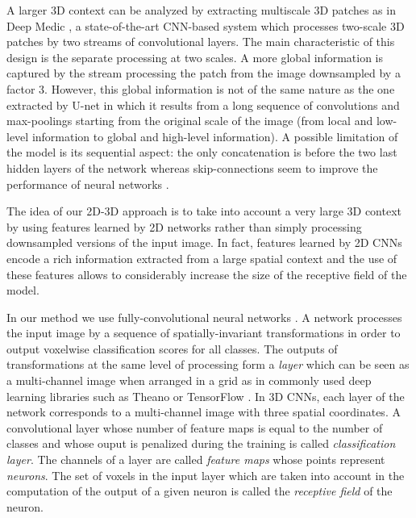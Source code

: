 \documentclass[preprint,12pt]{elsarticle}
\begin{document}
A larger 3D context can be analyzed by extracting multiscale 3D patches as in Deep Medic \cite{kamnitsas2016efficient}, a state-of-the-art CNN-based system which processes two-scale 3D patches by two streams of convolutional layers. The main characteristic of this design is the separate processing at two scales. A more global information is captured by the stream processing the patch from the image downsampled by a factor 3. However, this global information is not of the same nature as the one extracted by U-net \cite{ronneberger2015u} in which it results from a long sequence of convolutions and max-poolings starting from the original scale of the image (from local and low-level information to global and high-level information). A possible limitation of the model is its sequential aspect: the only concatenation is before the two last hidden layers of the network whereas skip-connections seem to improve the performance of neural networks \cite{he2016deep}.





The idea of our 2D-3D approach is to take into account a very large 3D context by using features learned by 2D networks rather than simply processing downsampled versions of the input image. In fact, features learned by 2D CNNs encode a rich information extracted from a large spatial context and the use of these features allows to considerably increase the size of the receptive field of the model.



In our method we use fully-convolutional neural networks \cite{long2015fully}. A network processes the input image by a sequence of spatially-invariant transformations in order to output voxelwise classification scores for all classes. The outputs of transformations at the same level of processing form a \textit{layer} which can be seen as a multi-channel image when arranged in a grid as in commonly used deep learning libraries such as Theano \cite{bergstra2010theano} or TensorFlow \cite{abadi2016tensorflow}. In 3D CNNs, each layer of the network corresponds to a multi-channel image with three spatial coordinates. A convolutional layer whose number of feature maps is equal to the number of classes and whose ouput is penalized during the training is called \textit{classification layer}. The channels of a layer are called \textit{feature maps} whose points represent \textit{neurons}. The set of voxels in the input layer which are taken into account in the computation of the output of a given neuron is called the \textit{receptive field} of the neuron. 
\end{document}

